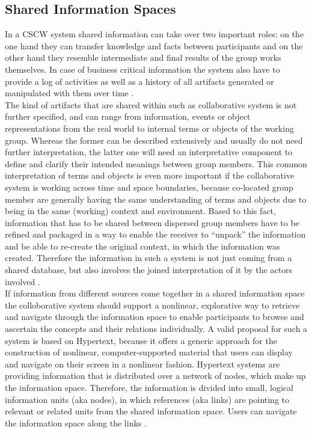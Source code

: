 
\subsection{Shared Information Spaces}
\label{sec:cscw_shared_spaces}

In a \gls{CSCW} system shared information can take over two important roles: on the one hand they can transfer knowledge and facts between participants and on the other hand they resemble intermediate and final results of the group works themselves. In case of business critical information the system also have to provide a log of activities as well as a history of all artifacts generated or manipulated with them over time \citep[pg. 295]{borghoff2000computer}. \\

The kind of artifacts that are shared within such as collaborative system is not further specified, and can range from information, events or object representations from the real world to internal terms or objects of the working group. Whereas the former can be described extensively and usually do not need further interpretation, the latter one will need an interpretative component to define and clarify their intended meanings between group members. This common interpretation of terms and objects is even more important if the collaborative system is working across time and space boundaries, because co-located group member are generally having the same understanding of terms and objects due to being in the same (working) context and environment. Based to this fact, information that has to be shared between dispersed group members have to be refined and packaged in a way to enable the receiver to ``unpack'' the information and be able to re-create the original context, in which the information was created. Therefore the information in such a system is not just coming from a shared database, but also involves the joined interpretation of it by the actors involved \citep{bannon1997constructing}. \\

If information from different sources come together in a shared information space the colloborative system should support a nonlinear, explorative way to retrieve and navigate through the information space to enable participants to browse and ascertain the concepts and their relations individually. A valid proposal for such a system is based on Hypertext, because it offers a generic approach for the construction of nonlinear, computer-supported material that users can display and navigate on their screen in a nonlinear fashion. Hypertext systems are providing information that is distributed over a network of nodes, which make up the information space. Therefore, the information is divided into small, logical information units (aka nodes), in which references (aka links) are pointing to relevant or related units from the shared information space. Users can navigate the information space along the links \citep[pg. 295-307]{borghoff2000computer}.


